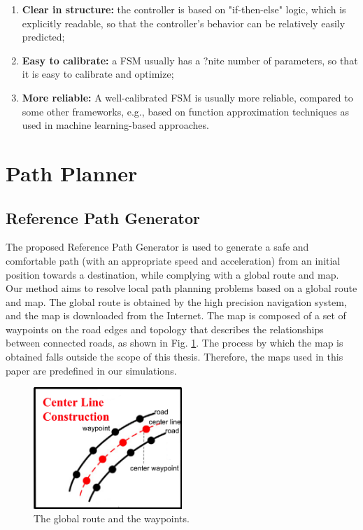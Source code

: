 \begin{enumerate}
\item \textbf {Clear in structure:} the controller is based on "if-then-else" logic, which is explicitly readable, so that the controller's behavior can be relatively easily predicted; 
\item \textbf {Easy to calibrate:} a FSM usually has a ?nite number of parameters, so that it is easy to calibrate and optimize;
\item \textbf {More reliable:} A well-calibrated FSM is usually more reliable, compared to some other frameworks, e.g., based on function approximation techniques as used in machine learning-based approaches.  
\end{enumerate}

\section{Path Planner}

\subsection{Reference Path Generator}

The proposed Reference Path Generator is used to generate a safe and comfortable path (with an appropriate speed and acceleration) from an initial position towards a destination, while complying with a global route and map. Our method aims to resolve local path planning problems based on a global route and map. The global route is obtained by the high precision navigation system, and the map is downloaded from the Internet. The map is composed of a set of waypoints on the road edges and topology that describes the relationships between connected roads, as shown in Fig. \ref{fig:center-line}. The process by which the map is obtained falls outside the scope of this thesis. Therefore, the maps used in this paper are predefined in our simulations.

\begin{figure}[h]
\centering
\includegraphics[width=0.5\textwidth]{figs/ch3/center-line}
\caption{The global route and the waypoints.}
\label{fig:center-line}
\end{figure}

